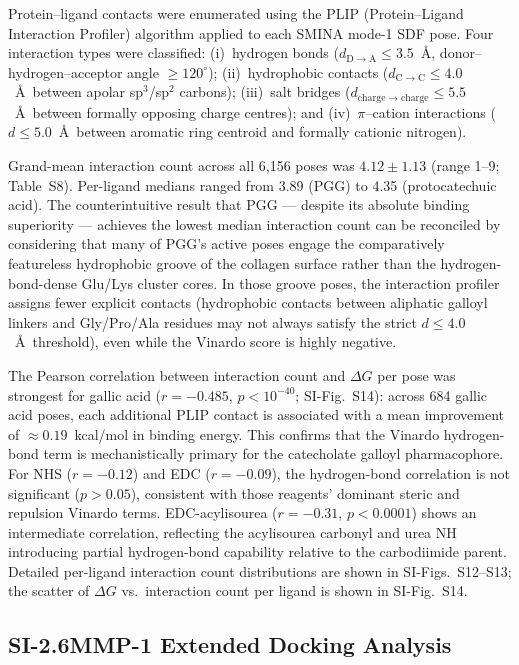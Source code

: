 \documentclass[11pt]{article}
\begin{document}
Protein--ligand contacts were enumerated using the PLIP (Protein--Ligand
Interaction Profiler) algorithm applied to each SMINA mode-1 SDF pose.
Four interaction types were classified: (i)~hydrogen bonds
($d_{\mathrm{D\to A}} \leq 3.5$~\AA, donor--hydrogen--acceptor angle
$\geq 120^{\circ}$); (ii)~hydrophobic contacts ($d_{\mathrm{C\to C}}
\leq 4.0$~\AA\ between apolar sp$^3$/sp$^2$ carbons);
(iii)~salt bridges ($d_{\mathrm{charge\to charge}} \leq 5.5$~\AA\ between
formally opposing charge centres); and (iv)~$\pi$--cation interactions
($d \leq 5.0$~\AA\ between aromatic ring centroid and formally cationic
nitrogen).

Grand-mean interaction count across all 6,156 poses was $4.12 \pm 1.13$
(range 1--9; Table~S8).
Per-ligand medians ranged from 3.89 (PGG) to 4.35 (protocatechuic acid).
The counterintuitive result that PGG --- despite its absolute binding
superiority --- achieves the lowest median interaction count can be reconciled
by considering that many of PGG's active poses engage the comparatively
featureless hydrophobic groove of the collagen surface rather than the
hydrogen-bond-dense Glu/Lys cluster cores.
In those groove poses, the interaction profiler assigns fewer explicit
contacts (hydrophobic contacts between aliphatic galloyl linkers and Gly/Pro/Ala
residues may not always satisfy the strict $d \leq 4.0$~\AA\ threshold),
even while the Vinardo score is highly negative.

The Pearson correlation between interaction count and $\Delta G$ per pose
was strongest for gallic acid ($r = -0.485$, $p < 10^{-40}$; SI-Fig.~S14):
across 684 gallic acid poses, each additional PLIP contact is associated with
a mean improvement of $\approx 0.19$~kcal/mol in binding energy.
This confirms that the Vinardo hydrogen-bond term is mechanistically primary
for the catecholate galloyl pharmacophore.
For NHS ($r = -0.12$) and EDC ($r = -0.09$), the hydrogen-bond correlation
is not significant ($p > 0.05$), consistent with those reagents' dominant
steric and repulsion Vinardo terms.
EDC-acylisourea ($r = -0.31$, $p < 0.0001$) shows an intermediate correlation,
reflecting the acylisourea carbonyl and urea NH introducing partial
hydrogen-bond capability relative to the carbodiimide parent.
Detailed per-ligand interaction count distributions are shown in
SI-Figs.~S12--S13; the scatter of $\Delta G$ vs.\ interaction count per
ligand is shown in SI-Fig.~S14.

\subsection*{SI-2.6\quad MMP-1 Extended Docking Analysis}
\end{document}
